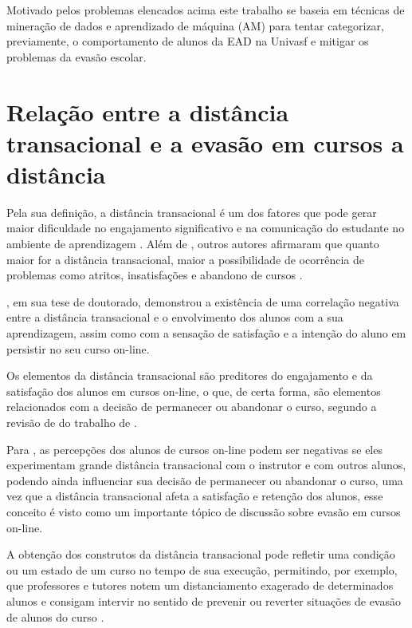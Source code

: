 Motivado pelos problemas elencados acima este trabalho se baseia em técnicas de
mineração de dados e aprendizado de máquina (AM) para tentar categorizar,
previamente, o comportamento de alunos da EAD na Univasf e mitigar os problemas
da evasão escolar.

\section{Relação entre a distância transacional e a evasão em cursos a distância}

Pela sua definição, a distância transacional é um dos fatores que pode gerar
maior dificuldade no engajamento significativo e na comunicação do estudante no
ambiente de aprendizagem \cite{goel2012transactional}. Além de
, outros autores afirmaram que quanto maior for a
distância transacional, maior a possibilidade de ocorrência de problemas como
atritos, insatisfações e abandono de cursos
\cite{zhang2003transactional,steinman2007educational,horzum2011developing,
mbwesa2014transactional,paul2015revisiting}.

, em sua tese de doutorado, demonstrou a
existência de uma correlação negativa entre a distância transacional e o
envolvimento dos alunos com a sua aprendizagem, assim como com a sensação de
satisfação e a intenção do aluno em persistir no seu curso on-line.

Os elementos da distância transacional são preditores do engajamento e da
satisfação dos alunos em cursos on-line, o que, de certa forma, são elementos
relacionados com a decisão de permanecer ou abandonar o curso, segundo a revisão
de  do trabalho de
.

Para , as percepções dos alunos de cursos
on-line podem ser negativas se eles experimentam grande distância transacional
com o instrutor e com outros alunos, podendo ainda influenciar sua decisão de
permanecer ou abandonar o curso, uma vez que a distância transacional afeta a
satisfação e retenção dos alunos, esse conceito é visto como um importante
tópico de discussão sobre evasão em cursos on-line.

A obtenção dos construtos da distância transacional pode refletir uma condição
ou um estado de um curso no tempo de sua execução, permitindo, por exemplo, que
professores e tutores notem um distanciamento exagerado de determinados alunos e
consigam intervir no sentido de prevenir ou reverter situações de evasão de
alunos do curso \cite{horzum2011developing}.

